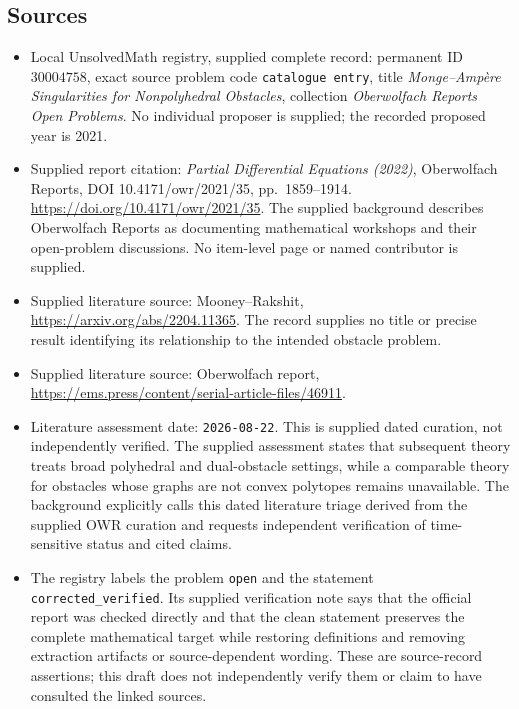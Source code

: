 \documentclass[11pt]{article}
\begin{document}
\subsection{Sources}
\begin{itemize}
\item Local UnsolvedMath registry, supplied complete record: permanent ID \(30004758\), exact source problem code \texttt{catalogue entry}, title \emph{Monge--Amp\`ere Singularities for Nonpolyhedral Obstacles}, collection \emph{Oberwolfach Reports Open Problems}. No individual proposer is supplied; the recorded proposed year is 2021.
\item Supplied report citation: \emph{Partial Differential Equations (2022)}, Oberwolfach Reports, DOI 10.4171/owr/2021/35, pp.\ 1859--1914. \url{https://doi.org/10.4171/owr/2021/35}. The supplied background describes Oberwolfach Reports as documenting mathematical workshops and their open-problem discussions. No item-level page or named contributor is supplied.
\item Supplied literature source: Mooney--Rakshit, \url{https://arxiv.org/abs/2204.11365}. The record supplies no title or precise result identifying its relationship to the intended obstacle problem.
\item Supplied literature source: Oberwolfach report, \url{https://ems.press/content/serial-article-files/46911}.
\item Literature assessment date: \texttt{2026-08-22}. This is supplied dated curation, not independently verified. The supplied assessment states that subsequent theory treats broad polyhedral and dual-obstacle settings, while a comparable theory for obstacles whose graphs are not convex polytopes remains unavailable. The background explicitly calls this dated literature triage derived from the supplied OWR curation and requests independent verification of time-sensitive status and cited claims.
\item The registry labels the problem \texttt{open} and the statement \texttt{corrected\_verified}. Its supplied verification note says that the official report was checked directly and that the clean statement preserves the complete mathematical target while restoring definitions and removing extraction artifacts or source-dependent wording. These are source-record assertions; this draft does not independently verify them or claim to have consulted the linked sources.
\end{itemize}
\end{document}
